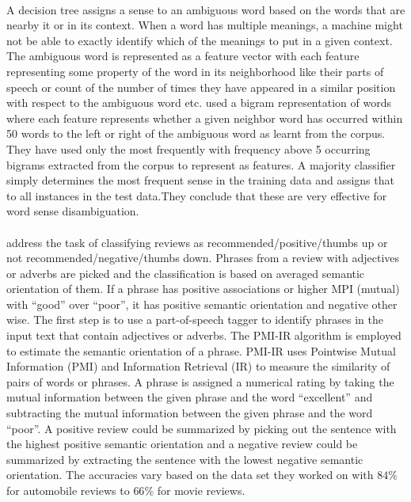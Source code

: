 \documentclass[a4paper,26pt]{article}
\begin{document}
\paragraph{}
A decision tree assigns a sense to an ambiguous word based on the words that are nearby it or in its context. When a word has multiple meanings, a machine might not be able to exactly identify which of the meanings to put in a given context. The ambiguous word is represented as a feature vector with each feature representing some property of the word in its neighborhood like their parts of speech or count of the number of times they have appeared in a similar position with respect to the ambiguous word etc. \cite{pedersen2001decision} used a bigram representation of words where each feature represents whether a given neighbor word has occurred within 50 words to the left or right of the ambiguous word as learnt from the corpus. They have used only the most frequently with frequency above 5 occurring bigrams extracted from the corpus to represent as features. A majority classifier simply determines the most frequent sense in the training data and assigns that to all instances in the test data.They conclude that these are very effective for word sense disambiguation. 

\paragraph{}
\cite{turney2002thumbs} address the task of classifying reviews as recommended/positive/thumbs up or not recommended/negative/thumbs down. Phrases from a review with adjectives or adverbs are picked and the classification is based on averaged semantic orientation of them. If a phrase has positive associations or higher MPI (mutual) with ``good'' over ``poor'', it has positive semantic orientation and negative other wise. The first step is to use a part-of-speech tagger to identify phrases in the input text that contain adjectives or adverbs. The PMI-IR algorithm is employed to estimate the semantic orientation of a phrase. PMI-IR uses Pointwise Mutual Information (PMI) and Information Retrieval (IR) to measure the similarity of pairs of words or phrases. A phrase is assigned a numerical rating by taking the mutual information between the given phrase and the word ``excellent'' and subtracting the mutual information between the given phrase and the word ``poor''. A positive review could be summarized by picking out the sentence with the highest positive semantic orientation and a negative review could be summarized by extracting the sentence with the lowest negative semantic orientation. The accuracies vary based on the data set they worked on with $84\%$ for automobile reviews to $66\%$ for movie reviews.
\end{document}
